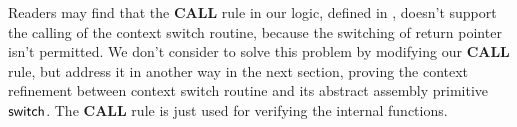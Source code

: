 
Readers may find that the \textbf{CALL} rule in our logic,
defined in \Fig{\ref{fig:Seleted Inference rules}}, doesn't 
support the calling of the context switch routine, because 
the switching of return pointer isn't permitted. We don't 
consider to solve this problem by modifying our \textbf{CALL} 
rule, but address it in another way in the next section, 
proving the context refinement between context switch routine 
and its abstract assembly primitive $\mathsf{switch}$. The \textbf{CALL} 
rule is just used for verifying the internal functions. 

